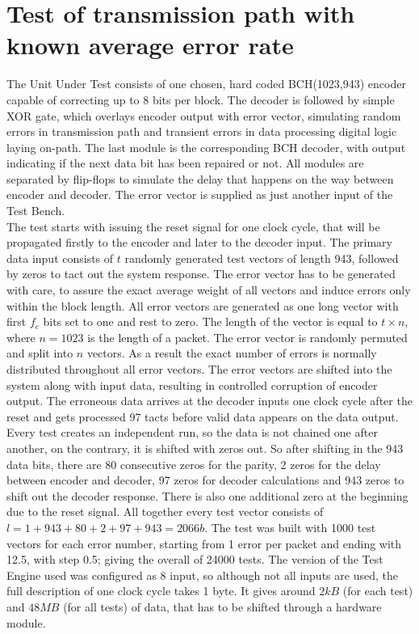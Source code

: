 \section{Test of transmission path with known average error rate}
The Unit Under Test consists of one chosen, hard coded BCH(1023,943) encoder capable of correcting up to 8 bits per block. The decoder is followed by simple XOR gate, which overlays encoder output with error vector, simulating random errors in transmission path and transient errors in data processing digital logic laying on-path. The last module is the corresponding BCH decoder, with output indicating if the next data bit has been repaired or not. All modules are separated by flip-flops to simulate the delay that happens on the way between encoder and decoder. The error vector is supplied as just another input of the Test Bench.\\

The test starts with issuing the reset signal for one clock cycle, that will be propagated firstly to the encoder and later to the decoder input. The primary data input consists of $t$ randomly generated test vectors of length 943, followed by zeros to tact out the system response. The error vector has to be generated with care, to assure the exact average weight of all vectors and induce errors only within the block length. All error vectors are generated as one long vector with first $f_c$ bits set to one and rest to zero. The length of the vector is equal to $t\times n$, where $n=1023$ is the length of a packet. The error vector is randomly permuted and split into $n$ vectors. As a result the exact number of errors is normally distributed throughout all error vectors. The error vectors are shifted into the system along with input data, resulting in controlled corruption of encoder output. The erroneous data arrives at the decoder inputs one clock cycle after the reset and gets processed 97 tacts before valid data appears on the data output. Every test creates an independent run, so the data is not chained one after another, on the contrary, it is shifted with zeros out. So after shifting in the 943 data bits, there are 80 consecutive zeros for the parity, 2 zeros for the delay between encoder and decoder, 97 zeros for decoder calculations and 943 zeros to shift out the decoder response. There is also one additional zero at the beginning due to the reset signal. All together every test vector consists of $l=1+943+80+2+97+943=2066b$. The test was built with 1000 test vectors for each error number, starting from 1 error per packet and ending with 12.5, with step 0.5; giving the overall of 24000 tests. The version of the Test Engine used was configured as 8 input, so although not all inputs are used, the full description of one clock cycle takes 1 byte. It gives around $2kB$ (for each test) and $48MB$ (for all tests) of data, that has to be shifted through a hardware module.

